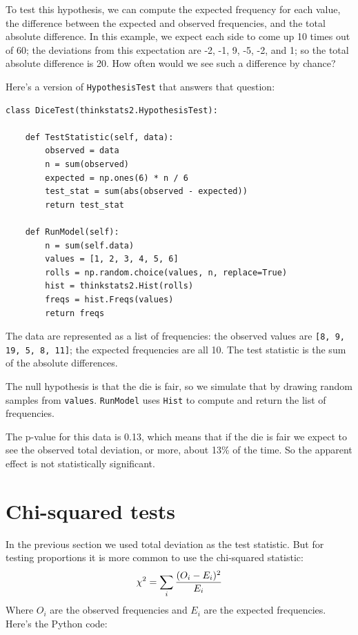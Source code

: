 \documentclass[12pt]{book}
\begin{document}
To test this hypothesis, we can compute the expected frequency for
each value, the difference between the expected and observed
frequencies, and the total absolute difference.  In this
example, we expect each side to come up 10 times out of 60; the
deviations from this expectation are -2, -1, 9, -5, -2, and 1; so the
total absolute difference is 20.  How often would we see such a
difference by chance?

Here's a version of \verb"HypothesisTest" that answers that question:

\begin{verbatim}
class DiceTest(thinkstats2.HypothesisTest):

    def TestStatistic(self, data):
        observed = data
        n = sum(observed)
        expected = np.ones(6) * n / 6
        test_stat = sum(abs(observed - expected))
        return test_stat

    def RunModel(self):
        n = sum(self.data)
        values = [1, 2, 3, 4, 5, 6]
        rolls = np.random.choice(values, n, replace=True)
        hist = thinkstats2.Hist(rolls)
        freqs = hist.Freqs(values)
        return freqs
\end{verbatim}

The data are represented as a list of frequencies: the observed
values are \verb"[8, 9, 19, 5, 8, 11]"; the expected frequencies
are all 10.  The test statistic is the sum of the absolute differences.

The null hypothesis is that the die is fair, so we simulate that by
drawing random samples from \verb"values".  \verb"RunModel" uses \verb"Hist" to
compute and return the list of frequencies.

The p-value for this data is 0.13, which means that if the die is
fair we expect to see the observed total deviation, or more, about
13\% of the time.  So the apparent effect is not statistically
significant.
   


\section{Chi-squared tests}
\label{casino2}

In the previous section we used total deviation as the test statistic.
But for testing proportions it is more common to use the chi-squared
statistic:
%
\[ \chi^2 = \sum_i \frac{(O_i - E_i)^2}{E_i} \]
%
% 
Where $O_i$ are the observed frequencies and $E_i$ are the expected
frequencies.  Here's the Python code:
\end{document}
